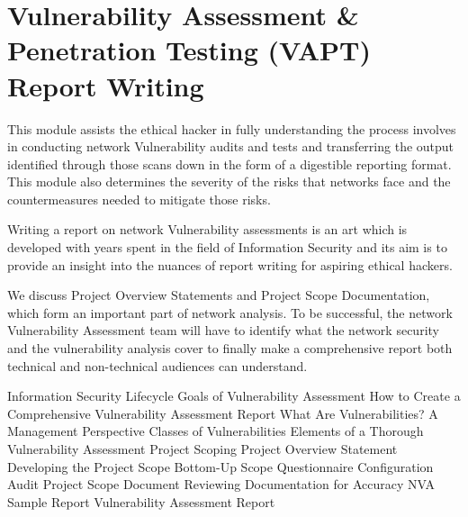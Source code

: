 \chapter{Vulnerability Assessment \& Penetration Testing (VAPT) Report Writing}

This module assists the ethical hacker in fully understanding the process involves in conducting network Vulnerability audits and tests and transferring the output identified through those scans down in the form of a digestible reporting format. This module also determines the severity of the risks that networks face and the countermeasures needed to mitigate those risks.

Writing a report on network Vulnerability assessments is an art which is developed with years spent in the field of Information Security and its aim is to provide an insight into the nuances of report writing for aspiring ethical hackers.

We discuss Project Overview Statements and Project Scope Documentation, which form an important part of network analysis. To be successful, the network Vulnerability Assessment team will have to identify what the network security and the vulnerability analysis cover to finally make a comprehensive report both technical and non-technical audiences can understand.


Information Security Lifecycle
Goals of Vulnerability Assessment
How to Create a Comprehensive Vulnerability Assessment Report
What Are Vulnerabilities? A Management Perspective
Classes of Vulnerabilities
Elements of a Thorough Vulnerability Assessment
Project Scoping
Project Overview Statement
Developing the Project Scope
Bottom-Up Scope Questionnaire
Configuration Audit
Project Scope Document
Reviewing Documentation for Accuracy
NVA Sample Report
Vulnerability Assessment Report
